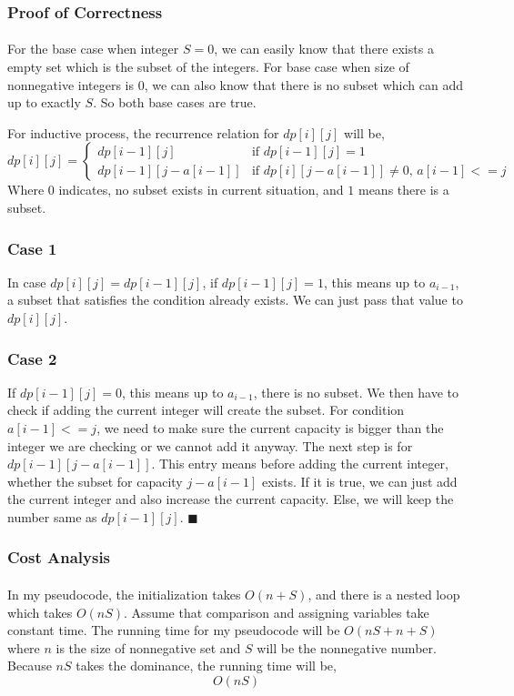 \documentclass{article}
\begin{document}
\subsubsection*{Proof of Correctness}
\paragraph{}

For the base case when integer $S=0$, we can easily know that there exists a empty set which is the 
subset of the integers. For base case when size of nonnegative integers is $0$, we can also know that 
there is no subset which can add up to exactly $S$. So both base cases are true.


For inductive process, the recurrence relation for $dp[i][j]$ will be,
$$dp[i][j] = \begin{cases}
  dp[i-1][j] & \text{if } dp[i-1][j] = 1\\
  dp[i-1][j-a[i-1]] & \text{if } dp[i][j-a[i-1]] \neq 0 \text{, } a[i-1] <= j
\end{cases}$$
Where $0$ indicates, no subset exists in current situation, and $1$ means there is a subset.

\subsubsection*{Case 1}
In case $dp[i][j] = dp[i-1][j]$, if $dp[i-1][j] = 1$, this means up to $a_{i-1}$,
a subset that satisfies the condition already exists. We can just pass that value to $dp[i][j]$.
\subsubsection*{Case 2}
If $dp[i-1][j] = 0$, this means up to $a_{i-1}$, there is no subset. We then have to check if adding
the current integer will create the subset. For condition $a[i-1] <= j$, we need to make sure the current
capacity is bigger than the integer we are checking or we cannot add it anyway. The next step is for
$dp[i-1][j - a[i-1]]$. This entry means before adding the current integer, whether the subset for capacity $j-a[i-1]$ exists.
If it is true, we can just add the current integer and also increase the current capacity.
Else, we will keep the number same as $dp[i-1][j]$. $\blacksquare$

\subsubsection*{Cost Analysis}
\paragraph{}
In my pseudocode, the initialization takes $O(n+S)$, and there is a nested loop which takes $O(nS)$.
Assume that comparison and assigning variables take constant time. The running time for my pseudocode will be $O(nS + n + S)$ where $n$ is the size of nonnegative set and
$S$ will be the nonnegative number. Because $nS$ takes the dominance, the running time will be,
$$O(nS)$$
\end{document}
